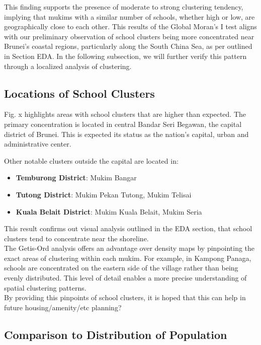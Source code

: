 \documentclass [12 pt]{article}
\begin{document}
This finding supports the presence of moderate to strong clustering tendency, implying that mukims with a similar number of schools, whether high or low, are geographically close to each other. This results of the Global Moran’s I test aligns with our preliminary observation of school clusters being more concentrated near Brunei’s coastal regions, particularly along the South China Sea, as per outlined in Section EDA. In the following subsection, we will further verify this pattern through a localized analysis of clustering. \\

\subsection{Locations of School Clusters}
Fig. x highlights areas with school clusters that are higher than expected. The primary concentration is located in central Bandar Seri Begawan, the capital district of Brunei. This is expected its status as the nation’s capital, urban and administrative center.

Other notable clusters outside the capital are located in:
\begin{itemize}
    \item \textbf{Temburong District}: Mukim Bangar
    \item \textbf{Tutong District}: Mukim Pekan Tutong, Mukim Telisai
    \item \textbf{Kuala Belait District}: Mukim Kuala Belait, Mukim Seria
\end{itemize}

This result confirms out visual analysis outlined in the EDA section,  that school clusters tend to concentrate near the shoreline. \\

The Getis-Ord analysis offers an advantage over density maps by pinpointing the exact areas of clustering within each mukim. For example, in Kampong Panaga, schools are concentrated on the eastern side of the village rather than being evenly distributed. This level of detail enables a more precise understanding of spatial clustering patterns. \\

By providing this pinpoints of school clusters, it is hoped that this can help in future housing/amenity/etc planning? \\


\subsection{Comparison to Distribution of Population}
\end{document}
